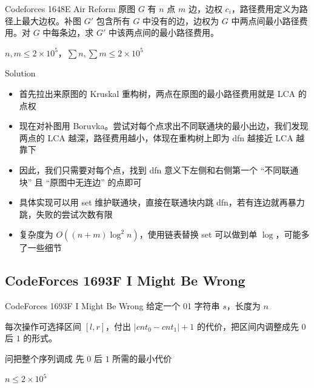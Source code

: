 ﻿\documentclass[aspectratio=169]{ctexbeamer}
\begin{document}
\begin{frame}{Codeforces 1648E Air Reform}
      原图 $G$ 有 $n$ 点 $m$ 边，边权 $c_i$，路径费用定义为路径上最大边权。补图 $G'$ 包含所有 $G$ 中没有的边，边权为 $G$ 中两点间最小路径费用。对 $G$ 中每条边，求 $G'$ 中该两点间的最小路径费用。

      $n,m\le 2\times 10^5$，$\sum n,\sum m\le 2\times 10^5$
\end{frame}

\begin{frame}{Solution}
    \begin{itemize}
        \item 首先拉出来原图的 Kruskal 重构树，两点在原图的最小路径费用就是 LCA 的点权
        \item 现在对补图用 Boruvka。尝试对每个点求出不同联通块的最小出边，我们发现两点的 LCA 越深，路径费用越小，体现在重构树上即为 dfn 越接近 LCA 越靠下
        \item 因此，我们只需要对每个点，找到 dfn 意义下左侧和右侧第一个 “不同联通块” 且 “原图中无连边” 的点即可
        \item 具体实现可以用 set 维护联通块，直接在联通块内跳 dfn，若有连边就再暴力跳，失败的尝试次数有限
        \item 复杂度为 $O((n+m)\log^2 n)$，使用链表替换 set 可以做到单 $\log$，可能多了一些细节
    \end{itemize}
\end{frame}








\subsection{CodeForces 1693F I Might Be Wrong}
\begin{frame}{CodeForces 1693F I Might Be Wrong}
    给定一个 01 字符串 $s$，长度为 $n$

    每次操作可选择区间 $[l,r]$，付出 $|cnt_0-cnt_1|+1$ 的代价，把区间内调整成先 $ 0 $ 后 $ 1 $ 的形式。
    
    问把整个序列调成 先 $ 0 $ 后 $ 1 $ 所需的最小代价

$n\leq 2\times 10^5$
\end{frame}
\end{document}
